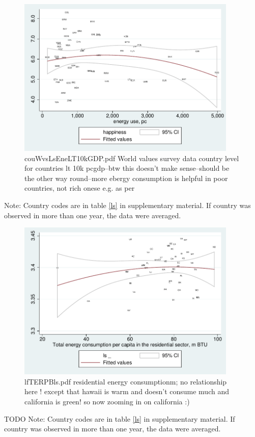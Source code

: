\documentclass[10pt, letterpaper]{article}
\begin{document}
\begin{spacing}{1.4}
\begin{figure}[H]
 \includegraphics[height=3in]{graphsAndTables/couWvsLsEneLT10kGDP.pdf}\centering
\caption{couWvsLsEneLT10kGDP.pdf World values survey data country level for
  countries lt 10k pcgdp--btw this doesn't make sense--should be the other way
  round--more ebergy consumption is helpful in poor countries, not rich onese
  e.g. as per \cite{mazur11}}\label{couWvsLsEneLT10kGDP.pdf}
\end{figure}
{\scriptsize Note: Country codes are in table \ref{ls} in supplementary
  material. If country was observed in more than one year, the data were averaged.}


\begin{figure}[H]
 \includegraphics[height=3in]{graphsAndTables/lfTERPBls.pdf}\centering
\caption{lfTERPBls.pdf residential energy consumptionm; no relationship here !
  except that hawaii is warm and doesn't consume much and california is green!
  so now zooming in on california :)}\label{grComTETPBgdp}
\end{figure}
{\scriptsize TODO Note: Country codes are in table \ref{ls} in supplementary
  material. If country was observed in more than one year, the data were averaged.}



\end{spacing}
\end{document}
